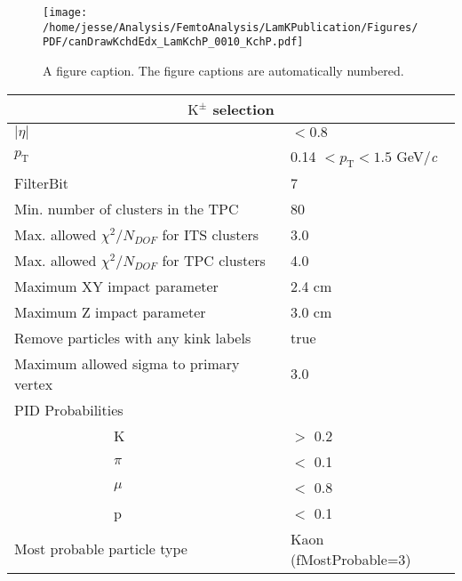\documentclass[ALICE,manyauthors]{cernphprep}
\newcommand{\Kpm}{$\mathrm{K^{\pm}}$\xspace}
\begin{document}
\begin{figure}[h]
 \centering
 \texttt{[image: /home/jesse/Analysis/FemtoAnalysis/LamKPublication/Figures/PDF/canDrawKchdEdx\_LamKchP\_0010\_KchP.pdf]}%
 \caption{\label{fig:KchPdEdx} A figure caption. The figure captions are
automatically numbered.}
\end{figure}

\begin{table}[htbp]
 \centering
  \begin{tabular}{lc|c|l}
   \hline  
   \multicolumn{4}{c}{\textbf{\Kpm selection}} \\
   \hline
   \multicolumn{3}{l|}{$|\eta|$} & $< 0.8$ \\
   \hline
   \multicolumn{3}{l|}{$p_{\mathrm{T}}$} & 0.14 $< p_{\mathrm{T}} < 1.5$ GeV/\textit{c} \\
   \hline
   \multicolumn{3}{l|}{FilterBit} & 7 \\
   \hline
   \multicolumn{3}{l|}{Min. number of clusters in the TPC} & 80 \\
   \hline
   \multicolumn{3}{l|}{Max. allowed $\chi^{2}/N_{DOF}$ for ITS clusters} & 3.0 \\
   \hline
   \multicolumn{3}{l|}{Max. allowed $\chi^{2}/N_{DOF}$ for TPC clusters} & 4.0 \\
   \hline   
   \multicolumn{3}{l|}{Maximum XY impact parameter} & 2.4 cm \\
   \hline
   \multicolumn{3}{l|}{Maximum Z impact parameter} & 3.0 cm \\
   \hline
   \multicolumn{3}{l|}{Remove particles with any kink labels} & true \\
   \hline
   \multicolumn{3}{l|}{Maximum allowed sigma to primary vertex} & 3.0 \\
   \hline   
   
   \multicolumn{4}{l}{PID Probabilities} \\
   \hline
    & \multicolumn{2}{l|}{K} & $>$ 0.2 \\
   \hline
    & \multicolumn{2}{l|}{$\pi$} & $<$ 0.1 \\
   \hline
    & \multicolumn{2}{l|}{$\mu$} & $<$ 0.8 \\
   \hline
    & \multicolumn{2}{l|}{p} & $<$ 0.1 \\
   \hline
   
   \multicolumn{3}{l|}{Most probable particle type} & Kaon (fMostProbable=3) \\
   \hline
   

\end{tabular}
\end{table}
\end{document}
